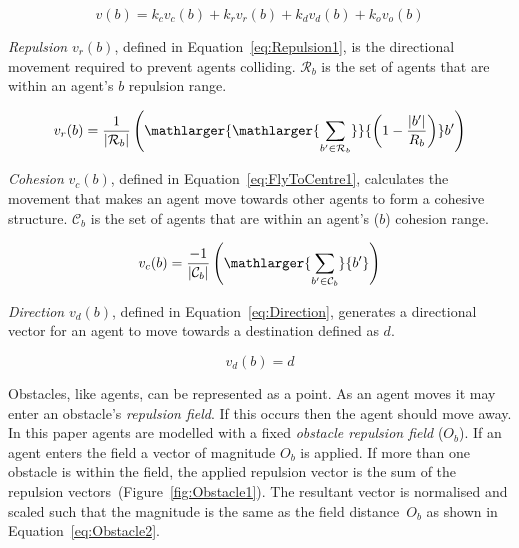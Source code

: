 \documentclass[preprint,12pt]{elsarticle}
\newcommand{\card}[1]{\vert{#1}\vert}
\newcommand{\magn}[1]{\vert{#1}\vert}
\begin{document}
\begin{equation}\label{eq:BotPhysics1}
  v(b) = k_cv_c(b) + k_rv_r(b) + k_dv_d(b) + k_ov_o(b)
\end{equation}

\textit{Repulsion} $v_r(b)$, defined in Equation~\ref{eq:Repulsion1}, is the
directional movement required to prevent agents colliding. $\mathcal R_b$ is
the set of agents that are within an agent's $b$ repulsion range.

\begin{equation}\label{eq:Repulsion1}
v_r(b) = 
\frac{1}{\card{\mathcal R_b}}
\left(
	\mathlarger{\mathlarger{\sum_{b' \in \mathcal R_b}}}
	{\left( 1-\frac{\magn{b'}}{R_b} \right)}
	b'
\right)
\end{equation}

\textit{Cohesion} $v_{c}(b)$, defined in Equation~\ref{eq:FlyToCentre1},
calculates the movement that makes an agent move towards other agents to form
a cohesive structure. $\mathcal C_b$ is the set of agents that are within an agent's ($b$) cohesion range.

\begin{equation}\label{eq:FlyToCentre1}
	v_c(b) =
	\frac{-1}{\card{\mathcal C_b}}\left({\mathlarger{\sum_{b' \in
	\mathcal C_b}}{b'}}\right)
\end{equation}

\textit{Direction} $v_d(b)$, defined in Equation~\ref{eq:Direction},
generates a directional vector for an agent to move towards a destination
defined as $d$.

\begin{equation}
\label{eq:Direction}
v_d(b) = d
\end{equation}

Obstacles, like agents, can be represented as a point. As an agent moves it may enter an obstacle's \textit{repulsion field}. If this occurs then the agent should move away. In this paper agents are modelled with a fixed \textit{obstacle repulsion field} ($O_b$). If an agent enters the field a vector of magnitude $O_b$ is applied. If more than one obstacle is within the field, the applied repulsion vector is the sum of the repulsion vectors~(Figure~\ref{fig:Obstacle1}). The resultant vector is normalised and scaled such that the magnitude is the same as the field distance~$O_b$ as shown in Equation~\ref{eq:Obstacle2}.
\end{document}
